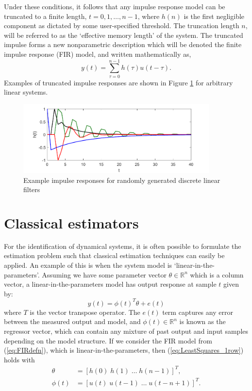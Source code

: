 Under these conditions, it follows that any impulse response model can be truncated to a finite length, $t= 0,1,\hdots,n-1$, where $h(n)$ is the first negligible component as dictated by some user-specified threshold. The truncation length $n$, will be referred to as the `effective memory length' of the system. The truncated impulse forms a new nonparametric description which will be denoted the finite impulse response (FIR) model, and written mathematically as, 
\begin{equation}
\label{eq:FIRdefn}
y(t) = \sum_{\tau=0}^{n-1} h(\tau) u(t-\tau).
\end{equation}
Examples of truncated impulse responses are shown in Figure \ref{fig:ImpulseExamples} for arbitrary linear systems. 

\begin{figure}[h]
\centering
\includegraphics[width = 0.9\textwidth]{Chapter2_SysIDandControl/RandomFIRs}
\caption{Example impulse responses for randomly generated discrete linear filters}
\label{fig:ImpulseExamples}
\end{figure}

\section{Classical estimators}

For the identification of dynamical systems, it is often possible to formulate the estimation problem such that classical estimation techniques can easily be applied. An example of this is when the system model is `linear-in-the-parameters'. Assuming we have some parameter vector $\theta \in \mathbb{R}^{n}$ which is a column vector, a linear-in-the-parameters model has output response at sample $t$ given by:
\begin{equation}
\label{eq:LeastSquares_1row}
y(t) = \phi(t)^T \theta + e(t)
\end{equation}
where $T$ is the vector transpose operator. The $e(t)$ term captures any error between the measured output and model, and $\phi(t) \in \mathbb{R}^{n}$ is known as the regressor vector, which can contain any mixture of past output and input samples depending on the model structure. If we consider the FIR model from (\ref{eq:FIRdefn}), which is linear-in-the-parameters, then (\ref{eq:LeastSquares_1row}) holds with
\begin{align}
\theta &= [h(0) \; h(1) \; \hdots \; h(n-1)]^T, \label{eq:ParameterVector4Impulse} \\
\phi(t) &= [u(t) \; u(t-1) \; \hdots \; u(t-n+1)]^T.
\end{align}

